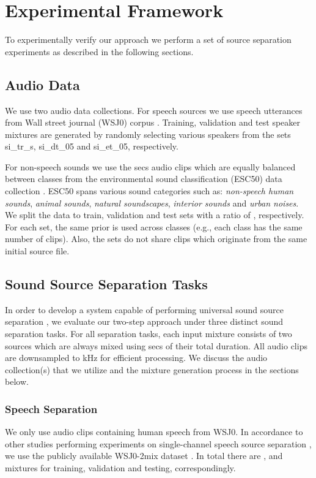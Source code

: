 \documentclass{article}
\begin{document}
\section{Experimental Framework} \label{sec:Framework} 
To experimentally verify our approach we perform a set of source 
separation experiments as described in the following sections. 
\subsection{Audio Data}
We use two audio data collections. For speech sources we use  speech utterances from Wall street journal (WSJ0) corpus \cite{WSJ0}. Training, validation and test speaker mixtures are generated by randomly selecting various speakers from the sets {\selectfont si\_tr\_s}, {\selectfont si\_dt\_05} and {\selectfont si\_et\_05}, respectively. 

For non-speech sounds we use the  secs audio clips which are equally balanced between  classes from the environmental sound classification (ESC50) data collection \cite{esc50}. ESC50 spans various sound categories such as: \textit{non-speech human sounds}, \textit{animal sounds}, \textit{natural soundscapes}, \textit{interior sounds} and \textit{urban noises}. We split the data to train, validation and test sets with a ratio of , respectively. For each set, the same prior is used across classes (e.g., each class has the same number of clips). Also, the sets do not share clips which originate from the same initial source file.  
\subsection{Sound Source Separation Tasks}
\label{sec:Framework:SeparationTasks}
In order to develop a system capable of performing universal sound source separation \cite{kavalerov2019universal}, we evaluate our two-step approach under three distinct sound separation tasks. For all separation tasks, each input mixture consists of two sources which are always mixed using secs of their total duration. All audio clips are downsampled to kHz for efficient processing. We discuss the audio collection(s) that we utilize and the mixture generation process in the sections below.
\subsubsection{Speech Separation} \label{sec:Framework:SeparationTasks:WSJ}
We only use audio clips containing human speech from WSJ0. In accordance to other studies performing experiments on single-channel speech source separation \cite{luo2019convTasNet, shi2019furcax, le2019phasebook, wichern2018phaseReconsLearnedTFrepresentations, wang2019deepPhaseReconSpeakerSep}, we use the publicly available WSJ0-2mix dataset \cite{hershey2016deepclustering}. In total there are ,  and  mixtures for training, validation and testing, correspondingly.
\end{document}
